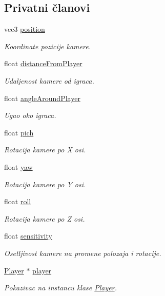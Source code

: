 \subsection*{Privatni članovi}
\begin{DoxyCompactItemize}
\item 
vec3 \hyperlink{classentity_1_1Camera_a3840344199c2da97dab4bce31d60f45e}{position}
\begin{DoxyCompactList}\small\item\em Koordinate pozicije kamere. \end{DoxyCompactList}\item 
float \hyperlink{classentity_1_1Camera_a9b05e6208aafb082a8d78d3e01d7e544}{distance\+From\+Player}
\begin{DoxyCompactList}\small\item\em Udaljenost kamere od igraca. \end{DoxyCompactList}\item 
float \hyperlink{classentity_1_1Camera_aa0d2e83177c5f3b587d030e5b8032fd2}{angle\+Around\+Player}
\begin{DoxyCompactList}\small\item\em Ugao oko igraca. \end{DoxyCompactList}\item 
float \hyperlink{classentity_1_1Camera_a33f9b55c4b44d7200e7517000fc499b2}{pich}
\begin{DoxyCompactList}\small\item\em Rotacija kamere po X osi. \end{DoxyCompactList}\item 
float \hyperlink{classentity_1_1Camera_a2ebfeecc4fe70c880813f7a4671d8b63}{yaw}
\begin{DoxyCompactList}\small\item\em Rotacija kamere po Y osi. \end{DoxyCompactList}\item 
float \hyperlink{classentity_1_1Camera_aed638e415fd894c7e39eb9fecf65afbb}{roll}
\begin{DoxyCompactList}\small\item\em Rotacija kamere po Z osi. \end{DoxyCompactList}\item 
float \hyperlink{classentity_1_1Camera_aae009950e0af66c4b5ed71f903b81513}{sensitivity}
\begin{DoxyCompactList}\small\item\em Osetljivost kamere na promene polozaja i rotacije. \end{DoxyCompactList}\item 
\hyperlink{classentity_1_1Player}{Player} $\ast$ \hyperlink{classentity_1_1Camera_ace429069cf20c1138038c00b10e2c608}{player}
\begin{DoxyCompactList}\small\item\em Pokazivac na instancu klase \hyperlink{classentity_1_1Player}{Player}. \end{DoxyCompactList}\end{DoxyCompactItemize}


